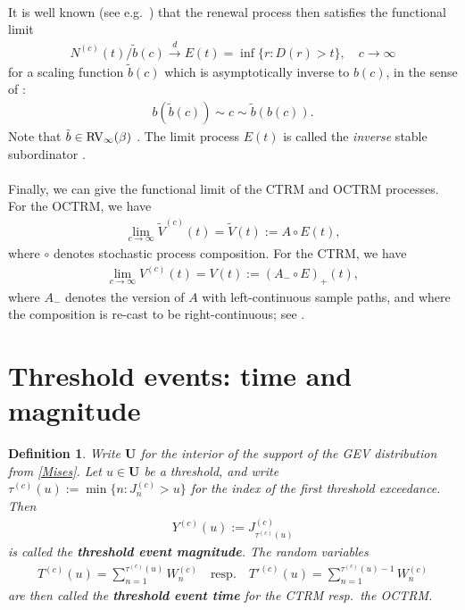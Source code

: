 \documentclass[12pt, a4paper]{article}
\newtheorem{definition}[equation]{Definition}
\newcommand{\1}{\mathbf 1}
\newcommand{\cd}{\overset{d}{\longrightarrow}}
\begin{document}
\paragraph{}
It is well known (see e.g.\ \cite{limitCTRW}) that the renewal
process then satisfies the functional limit
\begin{align}
N^{(c)}(t)/\tilde b(c) \cd E(t) = \inf\{r: D(r) > t\}, 
\quad c \to \infty
\end{align}
for a scaling function $\tilde b(c)$ which is asymptotically inverse to $b(c)$, in the sense of \cite[p.20]{seneta}: 
\begin{align}\label{eq:tildeb}
b(\tilde b(c)) \sim c \sim \tilde b(b(c)).
\end{align}
Note that $\tilde b \in {\rm RV}_\infty(\beta)$ 
\cite{limitCTRW}.
The limit process $E(t)$ is called the \emph{inverse} stable
subordinator \cite{invSubord}.

\paragraph{}
Finally, we can give the functional limit of the CTRM and OCTRM processes. 
For the OCTRM, we have 
\begin{align}
  \lim \limits_{c \to \infty} \tilde V^{(c)}(t) = \tilde V(t) 
  := A \circ E(t),
\end{align}
where $\circ$ denotes stochastic process composition. For the CTRM, we have 
\begin{align}
\lim \limits_{c \to \infty} V^{(c)}(t) = V(t) 
:= (A_- \circ E)_+(t),
\end{align}
where $A_-$ denotes the version of $A$ with left-continuous sample paths, and 
where the composition is re-cast to be right-continuous; see \cite{Hees17}. 


\section{Threshold events: time and magnitude}

\begin{definition}
Write $\mathbf U$ for the interior of the support of the GEV distribution from 
\eqref{Mises}. 
Let $u \in \mathbf U$ be a threshold, and write 
$
\tau^{(c)}(u) := \min\{n: J^{(c)}_n > u\}
$
for the index of the first threshold exceedance. 
Then
\begin{align*}
  Y^{(c)}(u) := J^{(c)}_{\tau^{(c)}(u)}
\end{align*}
is called the \textbf{threshold event magnitude}. The random variables 
\begin{align}
  T^{(c)}(u) = \sum_{n=1}^{\tau^{(c)}(u)} W^{(c)}_n \quad \text{resp.} \quad 
  T'^{(c)}(u) = \sum_{n=1}^{\tau^{(c)}(u)-1} W^{(c)}_n
\end{align}
are then called the \textbf{threshold event time} for the CTRM resp.\ the 
OCTRM. 
\end{definition}
\end{document}

